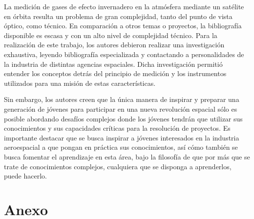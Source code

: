 \documentclass[11pt,titlepage]{article}
\begin{document}
La medición de gases de efecto invernadero en la atmósfera mediante un satélite en órbita resulta un problema de gran complejidad, tanto del punto de vista óptico, como técnico. En comparación a otros temas o proyectos, la bibliografía disponible es escasa y con un alto nivel de complejidad técnico. Para la realización de este trabajo, los autores debieron realizar una investigación exhaustiva, leyendo bibliografía especializada y contactando a personalidades de la industria de distintas agencias espaciales. Dicha investigación permitió entender los conceptos detrás del principio de medición y los instrumentos utilizados para una misión de estas características.\par
Sin embargo, los autores creen que la única manera de inspirar y preparar una generación de jóvenes para participar en una nueva revolución espacial sólo es posible abordando desafíos complejos donde los jóvenes tendrán que utilizar sus conocimientos y sus capacidades críticas para la resolución de proyectos. Es importante destacar que se busca inspirar a jóvenes interesados en la industria aeroespacial a que pongan en práctica sus conocimientos, así cómo también se busca fomentar el aprendizaje en esta área, bajo la filosofía de que por más que se trate de conocimientos complejos, cualquiera que se disponga a aprenderlos, puede hacerlo. 



\newpage

 
% 
% 
\newpage



\section{Anexo}
\end{document}
